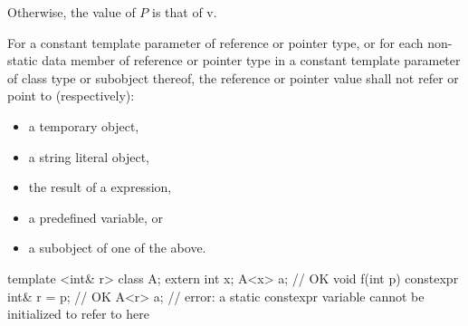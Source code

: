 \pnum
Otherwise, the value of $P$ is that of v.

\pnum
For a constant template parameter of reference or pointer type,
or for each non-static data member of reference or pointer type
in a constant template parameter of class type or subobject thereof,
the reference or pointer value shall not refer
or point to (respectively):
\begin{itemize}
\item a temporary object,
\item a string literal object,
\item the result of a  expression,
\item a predefined  variable, or
\item a subobject of one of the above.
\end{itemize}

\pnum
\begin{example}
\begin{codeblock}
template <int& r> class A{};
extern int x;
A<x> a;                 // OK
void f(int p) {
  constexpr int& r = p; // OK
  A<r> a;               // error: a static constexpr  variable cannot be initialized to refer to  here
}
\end{codeblock}
\end{example}

